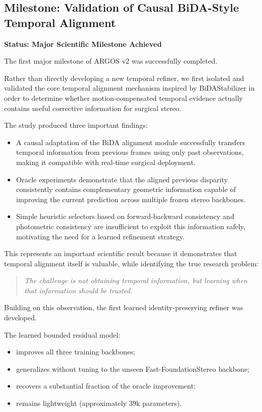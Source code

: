 \documentclass[11pt,a4paper]{article}
\begin{document}
\subsection{Milestone: Validation of Causal BiDA-Style Temporal Alignment}

\textbf{Status: Major Scientific Milestone Achieved}

The first major milestone of ARGOS v2 was successfully completed.

Rather than directly developing a new temporal refiner, we first isolated and validated the core temporal alignment mechanism inspired by BiDAStabilizer in order to determine whether motion-compensated temporal evidence actually contains useful corrective information for surgical stereo.

The study produced three important findings:

\begin{itemize}
    \item A causal adaptation of the BiDA alignment module successfully transfers temporal information from previous frames using only past observations, making it compatible with real-time surgical deployment.
    
    \item Oracle experiments demonstrate that the aligned previous disparity consistently contains complementary geometric information capable of improving the current prediction across multiple frozen stereo backbones.
    
    \item Simple heuristic selectors based on forward-backward consistency and photometric consistency are insufficient to exploit this information safely, motivating the need for a learned refinement strategy.
\end{itemize}

This represents an important scientific result because it demonstrates that temporal alignment itself is valuable, while identifying the true research problem:

\begin{quote}
\emph{The challenge is not obtaining temporal information, but learning when that information should be trusted.}
\end{quote}

Building on this observation, the first learned identity-preserving refiner was developed.

The learned bounded residual model:

\begin{itemize}
    \item improves all three training backbones;
    \item generalizes without tuning to the unseen Fast-FoundationStereo backbone;
    \item recovers a substantial fraction of the oracle improvement;
    \item remains lightweight (approximately 39k parameters).
\end{itemize}
\end{document}

